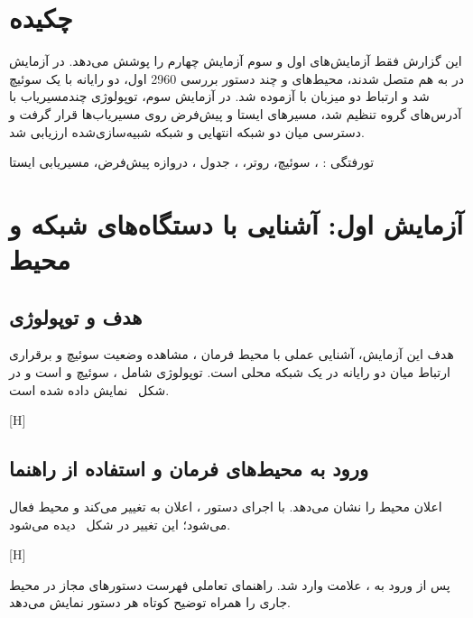 \section{چکیده}

این گزارش فقط آزمایش‌های اول و سوم آزمایش چهارم را پوشش می‌دهد.
در آزمایش اول، دو رایانه با یک سوئیچ ‎2960‎ در  به هم متصل شدند،
محیط‌های  و چند دستور  بررسی شد
و ارتباط دو میزبان با  آزموده شد.
در آزمایش سوم، توپولوژی چندمسیریاب با آدرس‌های گروه تنظیم شد، مسیرهای ایستا و پیش‌فرض
روی مسیریاب‌ها قرار گرفت و دسترسی میان دو شبکه انتهایی و شبکه شبیه‌سازی‌شده
 ارزیابی شد.

‌تورفتگی :
، سوئیچ، روتر، ، جدول ، دروازه پیش‌فرض، مسیریابی ایستا

\section{آزمایش اول: آشنایی با دستگاه‌های شبکه و محیط }

\subsection{هدف و توپولوژی}

هدف این آزمایش، آشنایی عملی با محیط فرمان ، مشاهده وضعیت سوئیچ
و برقراری ارتباط میان دو رایانه در یک شبکه محلی است. توپولوژی شامل ،
سوئیچ  و  است و در شکل~
نمایش داده شده است.

[H]

\subsection{ورود به محیط‌های فرمان و استفاده از راهنما}

اعلان  محیط  را نشان می‌دهد. با اجرای دستور ،
اعلان به  تغییر می‌کند و محیط  فعال می‌شود؛
این تغییر در شکل~ دیده می‌شود.

[H]

پس از ورود به ، علامت  وارد شد. راهنمای تعاملی
 فهرست دستورهای مجاز در محیط جاری را همراه توضیح کوتاه هر دستور
نمایش می‌دهد.

